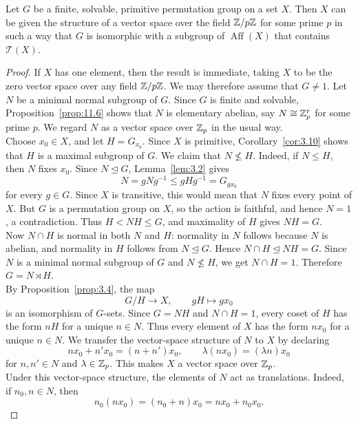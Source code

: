 \documentclass[../Odyssey_Project.tex]{subfiles}
\begin{document}
\begin{theorem}
\label{thm:11.12}
Let $G$ be a finite, solvable, primitive permutation group on a set $X$. Then $X$ can be given the structure of a vector space over the field $\mathbb{Z}/p\mathbb{Z}$ for some prime $p$ in such a way that $G$ is isomorphic with a subgroup of $\operatorname{Aff}(X)$ that contains $\mathcal{T}(X)$.
\end{theorem}
\begin{proof}
    If $X$ has one element, then the result is immediate, taking $X$ to be the zero vector space over any field $\mathbb{Z}/p\mathbb{Z}$. We may therefore assume that $G\neq 1$. Let $N$ be a minimal normal subgroup of $G$. Since $G$ is finite and solvable, Proposition~\ref{prop:11.6} shows that $N$ is elementary abelian, say $N\cong \mathbb{Z}_p^r$ for some prime $p$. We regard $N$ as a vector space over $\mathbb{Z}_p$ in the usual way.\\
    Choose $x_0\in X$, and let $H=G_{x_0}$. Since $X$ is primitive, Corollary~\ref{cor:3.10} shows that $H$ is a maximal subgroup of $G$. We claim that $N\nleq H$. Indeed, if $N\leq H$, then $N$ fixes $x_0$. Since $N\trianglelefteq G$, Lemma~\ref{lem:3.2} gives
    \[
        N=gNg^{-1}\leq gHg^{-1}=G_{gx_0}
    \]
    for every $g\in G$. Since $X$ is transitive, this would mean that $N$ fixes every point of $X$. But $G$ is a permutation group on $X$, so the action is faithful, and hence $N=1$, a contradiction. Thus $H<NH\leq G$, and maximality of $H$ gives $NH=G$.\\
    Now $N\cap H$ is normal in both $N$ and $H$: normality in $N$ follows because $N$ is abelian, and normality in $H$ follows from $N\trianglelefteq G$. Hence $N\cap H\trianglelefteq NH=G$. Since $N$ is a minimal normal subgroup of $G$ and $N\nleq H$, we get $N\cap H=1$. Therefore $G=N\rtimes H$.\\
    By Proposition~\ref{prop:3.4}, the map
    \[
        G/H\to X,\qquad gH\mapsto gx_0
    \]
    is an isomorphism of $G$-sets. Since $G=NH$ and $N\cap H=1$, every coset of $H$ has the form $nH$ for a unique $n\in N$. Thus every element of $X$ has the form $nx_0$ for a unique $n\in N$. We transfer the vector-space structure of $N$ to $X$ by declaring
    \[
        nx_0+n'x_0=(n+n')x_0,
        \qquad
        \lambda(nx_0)=(\lambda n)x_0
    \]
    for $n,n'\in N$ and $\lambda\in\mathbb{Z}_p$. This makes $X$ a vector space over $\mathbb{Z}_p$.\\
    Under this vector-space structure, the elements of $N$ act as translations. Indeed, if $n_0,n\in N$, then
    \[
        n_0(nx_0)=(n_0+n)x_0=nx_0+n_0x_0.
\]
\end{proof}
\end{document}
